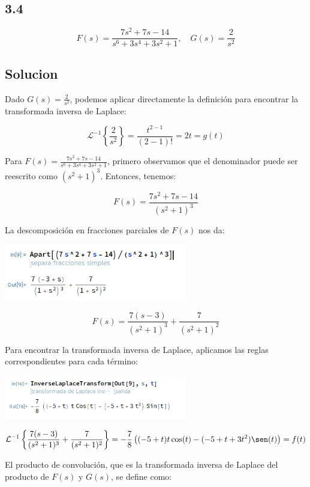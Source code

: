 \documentclass{article}
\begin{document}
\subsection{3.4}
\[
    F(s) = \frac{7s^2+7s-14}{s^6+3s^4+3s^2+1}, \quad G(s) = \frac{2}{s^2}
\]

\subsection*{Solucion}

Dado $G(s) = \frac{2}{s^2}$, podemos aplicar directamente la definición para encontrar la transformada inversa de Laplace:

\[
    \mathcal{L}^{-1}\left\{\frac{2}{s^2}\right\} = \frac{t^{2-1}}{(2-1)!} = 2t = g(t)
\]

Para $F(s) = \frac{7s^2+7s-14}{s^6+3s^4+3s^2+1}$, primero observamos que el denominador puede ser reescrito como $(s^2 + 1)^3$. Entonces, tenemos:

\[
    F(s) = \frac{7s^2 + 7s -14}{(s^2 + 1)^3}
\]

La descomposición en fracciones parciales de $F(s)$ nos da:

\begin{center}
    \includegraphics[width=0.6\textwidth]{./image.png}
\end{center}

\[F(s) = \frac{7(s-3)}{(s^2 + 1)^3} + \frac{7}{(s^2 + 1)^2}\]

Para encontrar la transformada inversa de Laplace, aplicamos las reglas correspondientes para cada término:

\begin{center}
    \includegraphics[width=0.6\textwidth]{./image2.png}
\end{center}

\[
    \mathcal{L}^{-1}\left\{\frac{7(s-3)}{(s^2 + 1)^3} + \frac{7}{(s^2 + 1)^2}\right\} = -\frac{7}{8} \left((-5 + t) t\cos(t) - (-5+t+3t^2)\sen(t)\right) = f(t)
\]

El producto de convolución, que es la transformada inversa de Laplace del producto de $F(s)$ y $G(s)$, se define como:
\end{document}
